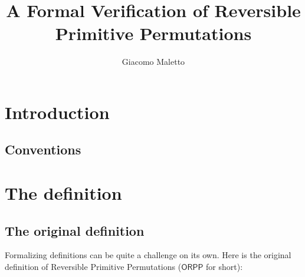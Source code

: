 \documentclass{book}
\title{A Formal Verification of Reversible Primitive Permutations}
\author{Giacomo Maletto}
\date{}
\theoremstyle{definition}
\newcommand{\ORPP}{\mathsf{ORPP}}
\begin{document}
\maketitle

\chapter*{Introduction}





\section*{Conventions}

\chapter{The definition}

\section{The original definition}

Formalizing definitions can be quite a challenge on its own.
Here is the original definition of Reversible Primitive Permutations ($\ORPP$ for short):
\end{document}
